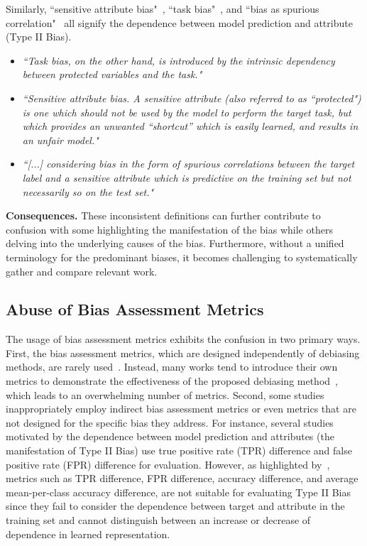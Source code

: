 \noindent
Similarly, ``sensitive attribute bias"~\cite{minority_group_vs_sensitive_attribute}, ``task bias"~\cite{BR_Net_dataset_vs_task}, and ``bias as spurious correlation"~\cite{spurious_correlation_Underrepresentation} all signify the dependence between model prediction and attribute (Type II Bias).
\begin{itemize}
    \item \emph{``Task bias, on the other hand, is introduced by the intrinsic dependency between protected variables and the task."}~\cite{BR_Net_dataset_vs_task}
    \item \emph{``Sensitive attribute bias. A sensitive attribute (also referred to as ``protected") is one which should not be used by the model to perform the target task, but which provides an unwanted “shortcut” which is easily learned, and results in an unfair model."}~\cite{minority_group_vs_sensitive_attribute}
    \item \emph{``[...] considering bias in the form of spurious correlations between the target label and a sensitive attribute which is predictive on the training set but not necessarily so on the test set."}~\cite{spurious_correlation_Underrepresentation} 
\end{itemize}



\noindent
\textbf{Consequences.}
These inconsistent definitions can further contribute to confusion with some highlighting the manifestation of the bias while others delving into the underlying causes of the bias.
Furthermore, without a unified terminology for the predominant biases, it becomes challenging to systematically gather and compare relevant work.








\subsection{Abuse of Bias Assessment Metrics}
The usage of bias assessment metrics exhibits the confusion in two primary ways.
First, the bias assessment metrics, which are designed independently of debiasing methods, are rarely used~\cite{RLB,Directional_BA}.
Instead, many works tend to introduce their own metrics to demonstrate the effectiveness of the proposed debiasing method~\cite{model_leakage,BA}, which leads to an overwhelming number of metrics.
Second, some studies inappropriately employ indirect bias assessment metrics or even metrics that are not designed for the specific bias they address.
For instance, several studies~\cite{FURL_PS,Fairalm_DP_difference_false_positive_rate} motivated by the dependence between model prediction and attributes (the manifestation of Type II Bias) use true positive rate (TPR) difference and false positive rate (FPR) difference for evaluation. 
However, as highlighted by~\cite{Directional_BA}, metrics such as TPR difference, FPR difference, accuracy difference, and average mean-per-class accuracy difference, are not suitable for evaluating Type II Bias since they fail to consider the dependence between target and attribute in the training set and cannot distinguish between an increase or decrease of dependence in learned representation. 


